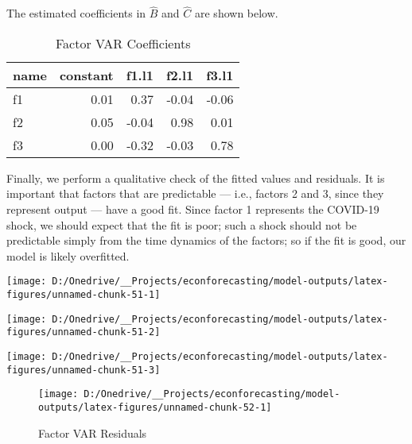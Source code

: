 \documentclass[11pt, letterpaper]{article}\usepackage[]{graphicx}\usepackage[]{color}
\begin{document}
The estimated coefficients in $\widehat{B}$ and $\widehat{C}$ are shown below.
\begin{table}[H]
\centering
\begingroup\footnotesize
\begin{tabular}{lrrrr}
  \hline
name & constant & f1.l1 & f2.l1 & f3.l1 \\ 
  \hline
f1 & 0.01 & 0.37 & -0.04 & -0.06 \\ 
  f2 & 0.05 & -0.04 & 0.98 & 0.01 \\ 
  f3 & 0.00 & -0.32 & -0.03 & 0.78 \\ 
   \hline
\end{tabular}
\endgroup
\caption{Factor VAR Coefficients} 
\end{table}



Finally, we perform a qualitative check of the fitted values and residuals. It is important that factors that are predictable --- i.e., factors 2 and 3, since they represent output --- have a good fit. Since factor 1 represents the COVID-19 shock, we should expect that the fit is poor; such a shock should not be predictable simply from the time dynamics of the factors; so if the fit is good, our model is likely overfitted.


{\centering \texttt{[image: D:/Onedrive/\_\_Projects/econforecasting/model-outputs/latex-figures/unnamed-chunk-51-1]} 

}




{\centering \texttt{[image: D:/Onedrive/\_\_Projects/econforecasting/model-outputs/latex-figures/unnamed-chunk-51-2]} 

}




{\centering \texttt{[image: D:/Onedrive/\_\_Projects/econforecasting/model-outputs/latex-figures/unnamed-chunk-51-3]} 

}





\begin{figure}[H]

{\centering \texttt{[image: D:/Onedrive/\_\_Projects/econforecasting/model-outputs/latex-figures/unnamed-chunk-52-1]} 

}

\caption[Factor VAR Residuals]{Factor VAR Residuals}\label{fig:unnamed-chunk-52}
\end{figure}
\end{document}
